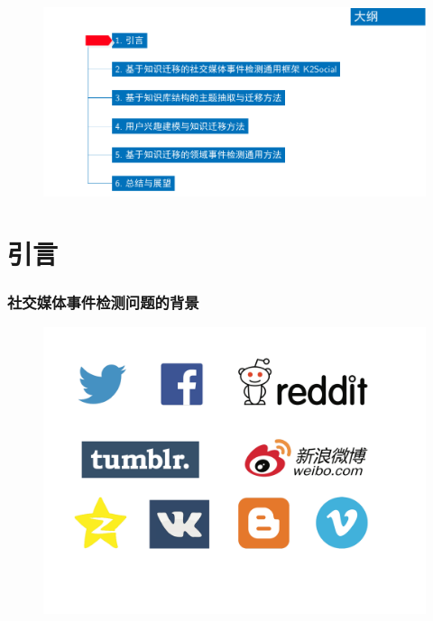 \begin{withoutheadline}
\begin{frame}
\vspace*{-13mm}
\begin{figure}
	\hspace*{-4.2mm}
    \includegraphics[width=1.0\paperwidth]{img/contents1_output.pdf}
\end{figure}
\end{frame}
\end{withoutheadline}

\section{引言}
\begin{frame}
\frametitle{社交媒体事件检测问题的背景}

\begin{figure}
    \includegraphics[width=0.75\paperwidth]{img/logos.pdf}
\end{figure}

\end{frame}


